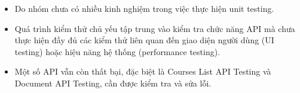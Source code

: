 \begin{itemize}
    \item Do nhóm chưa có nhiều kinh nghiệm trong việc thực hiện unit testing.
    \item Quá trình kiểm thử chủ yếu tập trung vào kiểm tra chức năng API mà chưa thực hiện đầy đủ các kiểm thử liên quan đến giao diện người dùng (UI testing) hoặc hiệu năng hệ thống (performance testing). 
    \item Một số API vẫn còn thất bại, đặc biệt là Courses List API Testing và Document API Testing, cần được kiểm tra và sửa lỗi.
\end{itemize}
